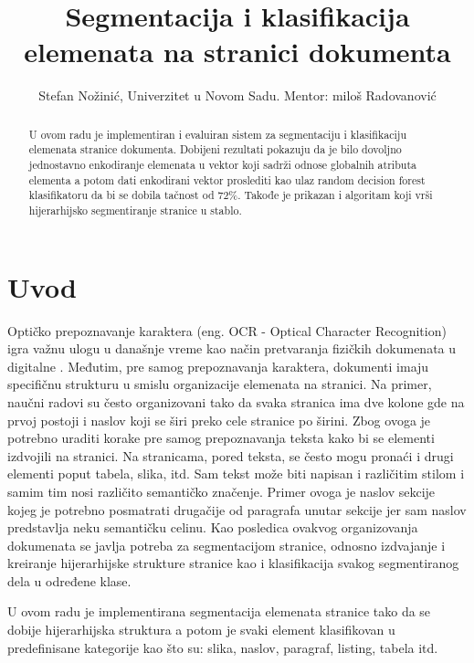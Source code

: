 \documentclass[]{amsart}
\begin{document}
\title{Segmentacija i klasifikacija elemenata na stranici dokumenta}
\author{Stefan Nožinić, Univerzitet u Novom Sadu. Mentor: miloš Radovanović}

\begin{abstract}
    U ovom radu je implementiran i evaluiran sistem za segmentaciju i klasifikaciju elemenata stranice dokumenta. Dobijeni rezultati pokazuju da je
    bilo dovoljno jednostavno enkodiranje elemenata u vektor koji sadrži odnose globalnih atributa elementa a potom dati enkodirani vektor proslediti kao ulaz random decision
    forest klasifikatoru da bi se dobila tačnost od 72\%. Takođe je prikazan i algoritam koji vrši hijerarhijsko segmentiranje stranice u stablo.     
\end{abstract}


\maketitle



\section{Uvod}
\label{sec:org8295245}

Optičko prepoznavanje karaktera (eng. OCR - Optical Character Recognition) igra važnu ulogu u današnje vreme kao način pretvaranja fizičkih dokumenata u digitalne \cite{mori1999optical}.
Međutim, pre samog prepoznavanja karaktera, dokumenti imaju specifičnu strukturu u smislu organizacije elemenata na stranici. Na primer, naučni radovi su često
organizovani tako da svaka stranica ima dve kolone gde na prvoj postoji i naslov koji se širi preko cele stranice po širini. Zbog ovoga je potrebno uraditi korake
pre samog prepoznavanja teksta kako bi se elementi izdvojili na stranici. Na stranicama, pored teksta, se često mogu pronaći i drugi elementi poput tabela, slika, itd.
Sam tekst može biti napisan i različitim stilom i samim tim nosi različito semantičko značenje. Primer ovoga je naslov sekcije kojeg je potrebno posmatrati
drugačije od paragrafa unutar sekcije jer sam naslov predstavlja neku semantičku celinu. 
Kao posledica ovakvog organizovanja dokumenata se javlja potreba za segmentacijom stranice, odnosno izdvajanje i kreiranje hijerarhijske strukture stranice kao i
klasifikacija svakog segmentiranog dela u određene klase.

U ovom radu je implementirana segmentacija elemenata stranice tako da se dobije hijerarhijska struktura a potom je svaki element klasifikovan u predefinisane kategorije
kao što su: slika, naslov, paragraf, listing, tabela itd.
\end{document}

